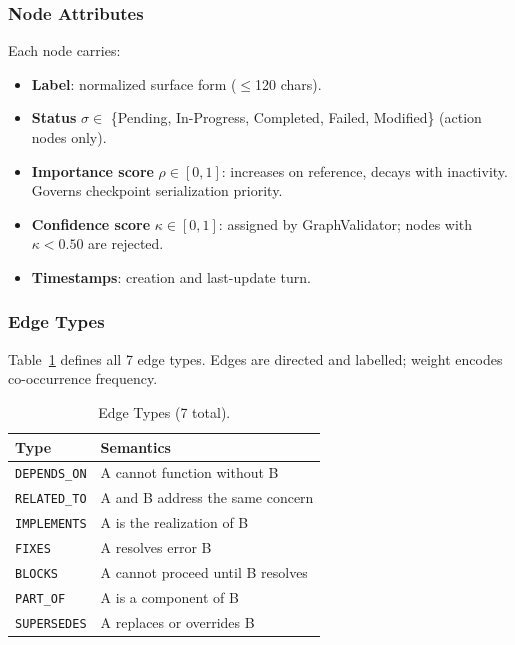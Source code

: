\documentclass[journal]{IEEEtran}
\begin{document}
\subsubsection{Node Attributes}
Each node carries:
\begin{itemize}
  \item \textbf{Label}: normalized surface form ($\leq$120 chars).
  \item \textbf{Status} $\sigma \in$ \{Pending, In-Progress,
    Completed, Failed, Modified\} (action nodes only).
  \item \textbf{Importance score} $\rho \in [0,1]$: increases
    on reference, decays with inactivity. Governs checkpoint
    serialization priority.
  \item \textbf{Confidence score} $\kappa \in [0,1]$: assigned
    by GraphValidator; nodes with $\kappa < 0.50$ are rejected.
  \item \textbf{Timestamps}: creation and last-update turn.
\end{itemize}

\subsubsection{Edge Types}
Table~\ref{tab:edgetypes} defines all 7 edge types.
Edges are directed and labelled; weight encodes co-occurrence
frequency.

\begin{table}[t]
  \centering
  \caption{Edge Types (7 total).}
  \label{tab:edgetypes}
  \renewcommand{\arraystretch}{1.2}
  \begin{tabular}{@{}p{2.1cm}p{5.5cm}@{}}
    \toprule
    \textbf{Type} & \textbf{Semantics} \\
    \midrule
    \texttt{DEPENDS\_ON}  & A cannot function without B \\
    \texttt{RELATED\_TO}  & A and B address the same concern \\
    \texttt{IMPLEMENTS}   & A is the realization of B \\
    \texttt{FIXES}        & A resolves error B \\
    \texttt{BLOCKS}       & A cannot proceed until B resolves \\
    \texttt{PART\_OF}     & A is a component of B \\
    \texttt{SUPERSEDES}   & A replaces or overrides B \\
    \bottomrule
  \end{tabular}
\end{table}
\end{document}
